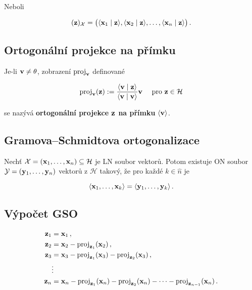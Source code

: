 \noindent Neboli

\[ (\mathbf{z})_{\mathcal X}=\big(\langle \mathbf{x}_1\mid \mathbf{z}\rangle, \langle \mathbf{x}_2\mid \mathbf{z}\rangle , \dots ,\langle \mathbf{x}_n\mid \mathbf{z}\rangle\big)\,. \]

\subsection*{Ortogonální projekce na přímku}

Je-li $\mathbf{v}\neq \theta$, zobrazení $\text{proj}_{\mathbf{v}}$ definované

\[ \text{proj}_{\mathbf{v}}(\mathbf{z}):=\frac{\langle \mathbf{v}\mid \mathbf{z}\rangle}{\langle \mathbf{v}\mid \mathbf{v}\rangle} \mathbf{v} \quad \text{ pro }\mathbf{z}\in \mathcal{H} \]

\noindent se nazývá \textbf{ortogonální projekce $\mathbf{z}$ na přímku} $\langle \mathbf{v}\rangle$.

\subsection*{Gramova--Schmidtova ortogonalizace}

Nechť $\mathcal{X}=(\mathbf{x}_1,\dots,\mathbf{x}_n)\subseteq \mathcal{H}$ je LN soubor
vektorů. Potom existuje ON soubor $\mathcal{Y}=(\mathbf{y}_1,\dots,\mathbf{y}_n)$ vektorů z
$\mathcal{H}$ takový, že pro každé $k\in \hat{n}$ je

\[ \langle\mathbf{x}_1,\dots,\mathbf{x}_k\rangle    =\langle\mathbf{y}_1,\dots,\mathbf{y}_k\rangle\,. \]

\subsection*{Výpočet GSO}

\begin{align*}
    \mathbf{z}_1 & =\mathbf{x}_1\,,                                                                           \\
    \mathbf{z}_2 & =\mathbf{x}_2-
    \text{proj}_{\mathbf{z}_1}(\mathbf{x}_2)\,,                                                                     \\
    \mathbf{z}_3 & =\mathbf{x}_3-\text{proj}_{\mathbf{z}_1}(\mathbf{x}_3)-\text{proj}_{\mathbf{z}_2}(\mathbf{x}_3)\,,                                 \\
          & \vdots                                                                              \\
    \mathbf{z}_n & =\mathbf{x}_n-\text{proj}_{\mathbf{z}_1}(\mathbf{x}_n)-\text{proj}_{\mathbf{z}_2}(\mathbf{x}_n)-\dots -\text{proj}_{\mathbf{z}_{n-1}}(\mathbf{x}_n)\,.
\end{align*}

\pagebreak
